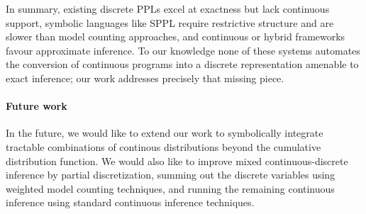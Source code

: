\documentclass[nonacm,anonymous]{acmart}
\begin{document}
\medskip  
In summary, existing discrete PPLs excel at exactness but lack continuous support, symbolic languages like SPPL require restrictive structure and are slower than model counting approaches, and continuous or hybrid frameworks favour approximate inference. To our knowledge none of these systems automates the conversion of continuous programs into a discrete representation amenable to exact inference; our work addresses precisely that missing piece.

\paragraph{Future work}
In the future, we would like to extend our work to symbolically integrate tractable combinations of continous distributions beyond the cumulative distribution function.
We would also like to improve mixed continuous-discrete inference by partial discretization, summing out the discrete variables using weighted model counting techniques, and running the remaining continuous inference using standard continuous inference techniques.



\end{document}
